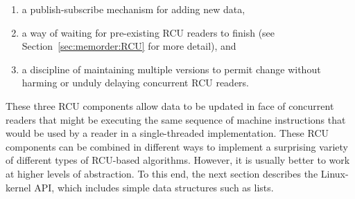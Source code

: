 \begin{enumerate}
\item	a publish-subscribe mechanism for adding new data,

\item	a way of waiting for pre-existing RCU readers to finish
	(see Section~\ref{sec:memorder:RCU} for more detail),
	and

\item	a discipline of maintaining multiple versions to permit
	change without harming or unduly delaying concurrent RCU readers.
\end{enumerate}

\QuickQuizEnd

These three RCU components allow data to be updated in face of concurrent
readers that might be executing the same sequence of machine instructions
that would be used by a reader in a single-threaded implementation.
These RCU components can be combined in different ways to implement a
surprising variety of different types of RCU-based algorithms.
However, it is usually better to work at higher levels of abstraction.
To this end, the next section describes the Linux-kernel API, which
includes simple data structures such as lists.
